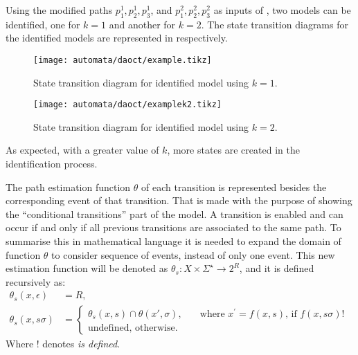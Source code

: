 Using the modified paths $p_1^1,p_2^1,p_3^1$,
and $p_1^2,p_2^2,p_3^2$ as inputs of , two models can be identified, one for $k=1$ and another for
$k=2$.
The state transition diagrams for the identified models are represented in  respectively. 

\begin{figure}[H]
  \centering \texttt{[image: automata/daoct/example.tikz]}
  \caption{State transition diagram for identified model using $k=1$.}
  \label{fig:examplek1}
\end{figure}


\begin{figure}[H]
  \centering \texttt{[image: automata/daoct/examplek2.tikz]}
  \caption{State transition diagram for identified model using $k=2$.}
  \label{fig:examplek2}
\end{figure}

As expected, with a greater value of $k$, more states are created in the
identification process.

The path estimation function $\theta$ of each transition is represented
besides the corresponding event of that transition. That is made with the
purpose of showing the ``conditional transitions'' part of the \DAOCT{} model. A
transition is enabled and can occur if and only if all previous transitions are
associated to the same path. To summarise this in mathematical language it is
needed to expand the domain of function $\theta$ to consider sequence of events,
instead of only one event. This new estimation function will be denoted as
$\theta_s : X \times \Sigma^\star \rightarrow 2^R$, and it is defined
recursively as:
\begin{align}
  \theta_s(x,\epsilon)&=R,\nonumber\\
  \theta_s(x,s\sigma)&=
                       \begin{cases}
                         \theta_s(x,s) \cap \theta(x',\sigma),       & \quad \text{where $x^\prime = f(x,s)$, if $f(x,s\sigma)!$ }\\
                         \text{undefined, otherwise.}  &
                       \end{cases}
\end{align}
Where ! denotes \emph{is defined}.

